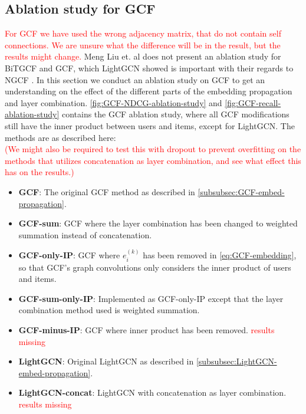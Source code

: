 \subsection{Ablation study for GCF}
\textcolor{red}{For GCF we have used the wrong adjacency matrix, that do not contain self connections. We are unsure what the difference will be in the result, but the results might change.}
Meng Liu et. al does not present an ablation study for BiTGCF and GCF, which LightGCN showed is important with their regards to NGCF \cite{lightgcn,BiTGCF}.
In this section we conduct an ablation study on GCF to get an understanding on the effect of the different parts of the embedding propagation and layer combination.
\autoref{fig:GCF-NDCG-ablation-study} and \autoref{fig:GCF-recall-ablation-study} contains the GCF ablation study, where all GCF modifications still have the inner product between users and items, except for LightGCN.
The methods are as described here:\\
\textcolor{red}{(We might also be required to test this with dropout to prevent overfitting on the methods that utilizes concatenation as layer combination, and see what effect this has on the results.)}
\begin{itemize}
    \item \textbf{GCF}: The original GCF method as described in \autoref{subsubsec:GCF-embed-propagation}.
    \item \textbf{GCF-sum}: GCF where the layer combination has been changed to weighted summation instead of concatenation.
    \item \textbf{GCF-only-IP}:  GCF where $e_i^{(k)}$ has been removed in \autoref{eq:GCF-embedding}, so that GCF's graph convolutions only considers the inner product of users and items.
    \item \textbf{GCF-sum-only-IP}: Implemented as GCF-only-IP except that the layer combination method used is weighted summation.
    \item \textbf{GCF-minus-IP}: GCF where inner product has been removed. \textcolor{red}{results missing}
    \item \textbf{LightGCN}: Original LightGCN as described in \autoref{subsubsec:LightGCN-embed-propagation}.
    \item \textbf{LightGCN-concat}: LightGCN with concatenation as layer combination. \textcolor{red}{results missing}
\end{itemize}

